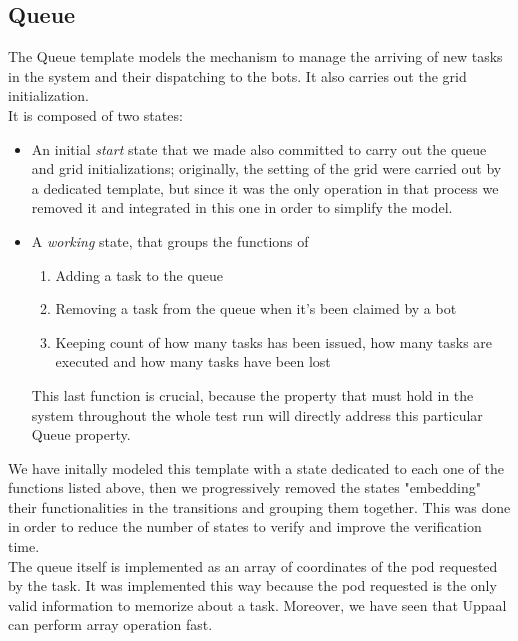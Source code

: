 \documentclass[10pt,a4paper]{article}
\begin{document}
		\subsection{Queue}
			The Queue template models the mechanism to manage the arriving of new tasks in the system and their dispatching to the bots. It also carries out the grid initialization.\\
			It is composed of two states:
			\begin{itemize}
				\item An initial \emph{start} state that we made also committed to carry out the queue and grid initializations; originally, the setting of the grid were carried out by a dedicated template, but since it was the only operation in that process we removed it and integrated in this one in order to simplify the model.
				\item A \emph{working} state, that groups the functions of
					\begin{enumerate}
						\item Adding a task to the queue
						\item Removing a task from the queue when it's been claimed by a bot
						\item Keeping count of how many tasks has been issued, how many tasks are executed and how many tasks have been lost
					\end{enumerate}
					This last function is crucial, because the property that must hold in the system throughout the whole test run will directly address this particular Queue property.
			\end{itemize}
			We have initally modeled this template with a state dedicated to each one of the functions listed above, then we progressively removed the states "embedding" their functionalities in the transitions and grouping them together. This was done in order to reduce the number of states to verify and improve the verification time.\\
			The queue itself is implemented as an array of coordinates of the pod requested by the task. It was implemented this way because the pod requested is the only valid information to memorize about a task. Moreover, we have seen that Uppaal can perform array operation fast. 
		
\end{document}
